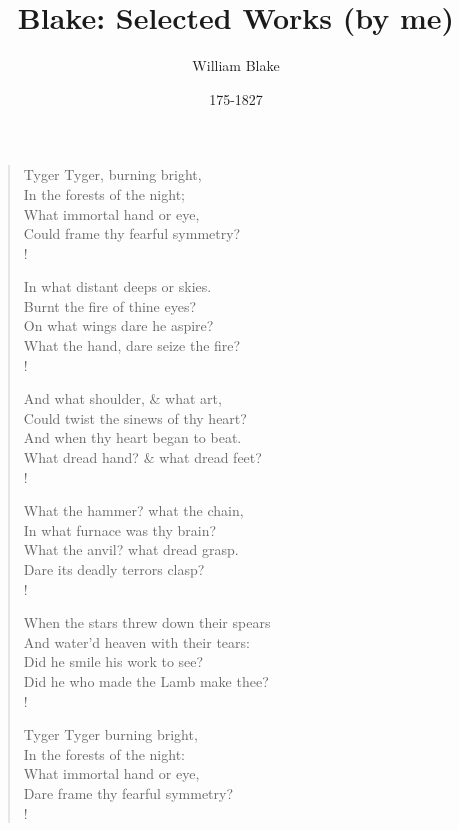 \documentclass[9pt]{extarticle}
\title{Blake: Selected Works (by me)}
\author{William Blake}
\date{175-1827}
\newcommand{\attrib}[1]{%
	\nopagebreak{\vspace{2ex}\raggedleft #1\par}}
\begin{document}
	
	\maketitle
	
	\tableofcontents
	
\newpage
{}
\begin{verse}
	\begin{altverse} 
		
		Tyger Tyger, burning bright,\\
		In the forests of the night;\\
		What immortal hand or eye,\\
		Could frame thy fearful symmetry?\\!
		
		In what distant deeps or skies.\\
		Burnt the fire of thine eyes?\\
		On what wings dare he aspire?\\
		What the hand, dare seize the fire?\\!
		
		And what shoulder, \& what art,\\
		Could twist the sinews of thy heart?\\
		And when thy heart began to beat.\\
		What dread hand? \& what dread feet?\\!
		
		What the hammer? what the chain,\\
		In what furnace was thy brain?\\
		What the anvil? what dread grasp.\\
		Dare its deadly terrors clasp?\\!
		
		When the stars threw down their spears\\
		And water'd heaven with their tears:\\
		Did he smile his work to see?\\
		Did he who made the Lamb make thee?\\!
		
		Tyger Tyger burning bright,\\
		In the forests of the night:\\
		What immortal hand or eye,\\
		Dare frame thy fearful symmetry?\\!
		
	\end{altverse}
\end{verse}
\attrib{ William Blake (1794)}
\end{document}

